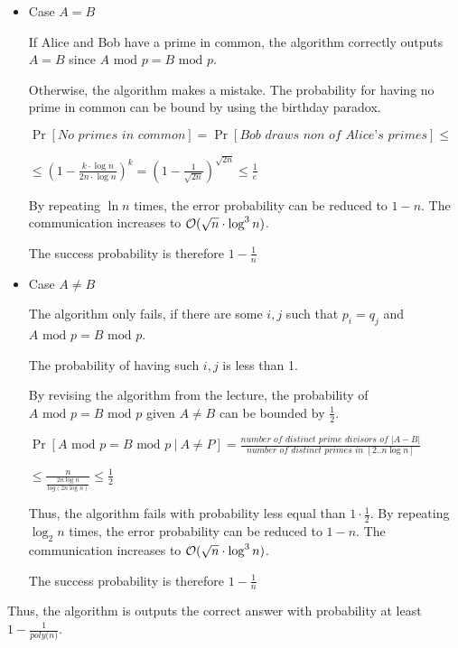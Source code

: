 \begin{itemize}
    \item Case $A = B$
    
    If Alice and Bob have a prime in common, the algorithm correctly outputs $A = B$ since $A \text{ mod } p = B \text{ mod } p$.
    
    Otherwise, the algorithm makes a mistake. The probability for having no prime in common can be bound by using the birthday paradox. 
    
    $
    \Pr[\textit{No primes in common}] =
    \Pr[\textit{Bob draws non of Alice's primes}] \leq
    $
    
    $\leq
    \left(1 - \frac{k \cdot \log n}{2n \cdot \log n}\right)^{k} =
    \left(1 - \frac{1}{\sqrt{2n}}\right)^{\sqrt{2n}} \leq
    \frac{1}{e}
    $
    
    By repeating $\ln n$ times, the error probability can be reduced to $1 - n$. The communication increases to $\mathcal{O}(\sqrt{n} \cdot \log^3 n)$.
    
    The success probability is therefore $1 - \frac{1}{n}$
    
    \item Case $A \neq B$
    
    The algorithm only fails, if there are some $i, j$ such that $p_i = q_j$ and $A \text{ mod } p = B \text{ mod } p$.
    
    The probability of having such $i, j$ is less than 1.
    
    By revising the algorithm from the lecture, the probability of $A \text{ mod } p = B \text{ mod } p$ given $A \neq B$ can be bounded by $\frac{1}{2}$. 
    
    $
    \Pr[A \text{ mod } p = B \text{ mod } p ~|~ A \neq P] = 
    \frac{\textit{number of distinct prime divisors of } |A - B|}{\textit{number of distinct primes in } [2..n\log n]}
    $
    
    $ \leq 
    \frac{n}{\frac{2n \log n}{log (2n \log n)}} \leq \frac{1}{2}
    $
    
    Thus, the algorithm fails with probability less equal than $1 \cdot \frac{1}{2}$. By repeating $\log_2 n$ times, the error probability can be reduced to $1 - n$. The communication increases to $\mathcal{O}(\sqrt{n} \cdot \log^3 n)$.
    
    The success probability is therefore $1 - \frac{1}{n}$
    

    
\end{itemize}

Thus, the algorithm is outputs the correct answer with probability at least $1 - \frac{1}{\textit{poly(n)}}$.



\pagebreak